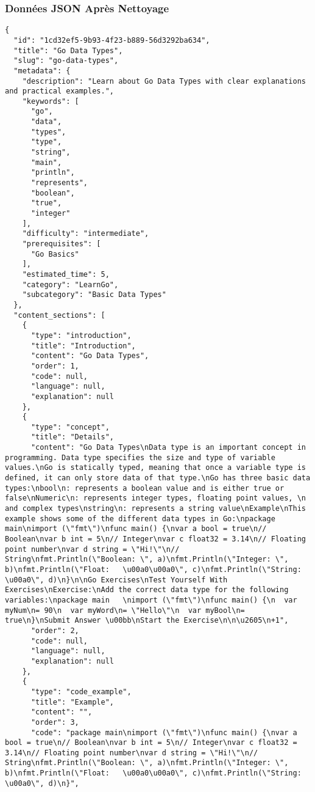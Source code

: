 \documentclass[12pt, a4paper]{article}
\begin{document}
\subsubsection*{Données JSON Après Nettoyage}
\begin{lstlisting}[style=json, caption=Extrait de données après application du script de nettoyage, label=lst:json_after]
{
  "id": "1cd32ef5-9b93-4f23-b889-56d3292ba634",
  "title": "Go Data Types",
  "slug": "go-data-types",
  "metadata": {
    "description": "Learn about Go Data Types with clear explanations and practical examples.",
    "keywords": [
      "go",
      "data",
      "types",
      "type",
      "string",
      "main",
      "println",
      "represents",
      "boolean",
      "true",
      "integer"
    ],
    "difficulty": "intermediate",
    "prerequisites": [
      "Go Basics"
    ],
    "estimated_time": 5,
    "category": "LearnGo",
    "subcategory": "Basic Data Types"
  },
  "content_sections": [
    {
      "type": "introduction",
      "title": "Introduction",
      "content": "Go Data Types",
      "order": 1,
      "code": null,
      "language": null,
      "explanation": null
    },
    {
      "type": "concept",
      "title": "Details",
      "content": "Go Data Types\nData type is an important concept in programming. Data type specifies the size and type of variable values.\nGo is statically typed, meaning that once a variable type is defined, it can only store data of that type.\nGo has three basic data types:\nbool\n: represents a boolean value and is either true or false\nNumeric\n: represents integer types, floating point values, \n  and complex types\nstring\n: represents a string value\nExample\nThis example shows some of the different data types in Go:\npackage main\nimport (\"fmt\")\nfunc main() {\nvar a bool = true\n// Boolean\nvar b int = 5\n// Integer\nvar c float32 = 3.14\n// Floating point number\nvar d string = \"Hi!\"\n// String\nfmt.Println(\"Boolean: \", a)\nfmt.Println(\"Integer: \", b)\nfmt.Println(\"Float:   \u00a0\u00a0\", c)\nfmt.Println(\"String: \u00a0\", d)\n}\n\nGo Exercises\nTest Yourself With Exercises\nExercise:\nAdd the correct data type for the following variables:\npackage main   \nimport (\"fmt\")\nfunc main() {\n  var myNum\n= 90\n  var myWord\n= \"Hello\"\n  var myBool\n= true\n}\nSubmit Answer \u00bb\nStart the Exercise\n\n\u2605\n+1",
      "order": 2,
      "code": null,
      "language": null,
      "explanation": null
    },
    {
      "type": "code_example",
      "title": "Example",
      "content": "",
      "order": 3,
      "code": "package main\nimport (\"fmt\")\nfunc main() {\nvar a bool = true\n// Boolean\nvar b int = 5\n// Integer\nvar c float32 = 3.14\n// Floating point number\nvar d string = \"Hi!\"\n// String\nfmt.Println(\"Boolean: \", a)\nfmt.Println(\"Integer: \", b)\nfmt.Println(\"Float:   \u00a0\u00a0\", c)\nfmt.Println(\"String: \u00a0\", d)\n}",

\end{lstlisting}
\end{document}
